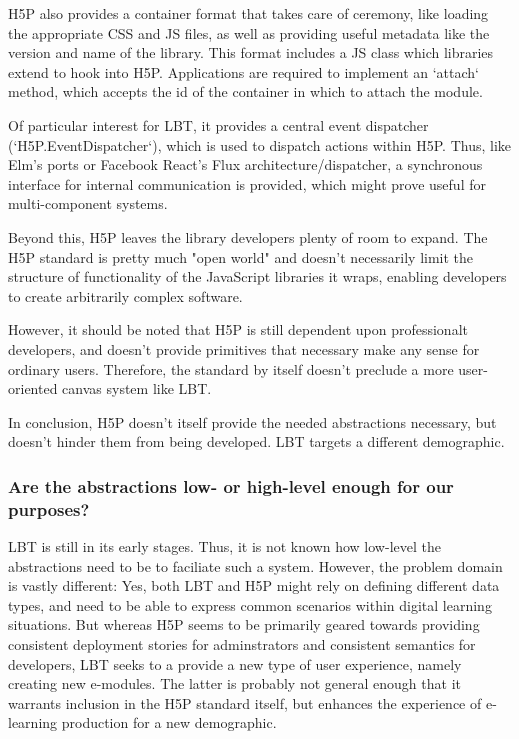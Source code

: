H5P also provides a container format that takes care of ceremony, like loading
the appropriate CSS and JS files, as well as providing useful metadata like the
version and name of the library. This format includes a JS class which libraries
extend to hook into H5P. Applications are required to implement an `attach`
method, which accepts the id of the container in which to attach the module.

Of particular interest for LBT, it provides a central event dispatcher
(`H5P.EventDispatcher`)\cite{h5pdispatch}, which is used to dispatch actions
within H5P. Thus, like Elm's ports or Facebook React's Flux
architecture/dispatcher, a synchronous interface for internal communication is
provided, which might prove useful for multi-component systems.

Beyond this, H5P leaves the library developers plenty of room to expand. The H5P
standard is pretty much "open world" and doesn't necessarily limit the structure
of functionality of the JavaScript libraries it wraps, enabling developers to
create arbitrarily complex software.

However, it should be noted that H5P is still dependent upon professionalt
developers, and doesn't provide primitives that necessary make any sense for
ordinary users. Therefore, the standard by itself doesn't preclude a more
user-oriented canvas system like LBT.

In conclusion, H5P doesn't itself provide the needed abstractions necessary, but
doesn't hinder them from being developed. LBT targets a different demographic.

\subsubsection{Are the abstractions low- or high-level enough for our purposes?}

LBT is still in its early stages. Thus, it is not known how low-level the
abstractions need to be to faciliate such a system. However, the problem domain
is vastly different: Yes, both LBT and H5P might rely on defining different data
types, and need to be able to express common scenarios within digital learning
situations. But whereas H5P seems to be primarily geared towards providing
consistent deployment stories for adminstrators and consistent semantics for
developers, LBT seeks to a provide a new type of user experience, namely
creating new e-modules. The latter is probably not general enough that it
warrants inclusion in the H5P standard itself, but enhances the experience of
e-learning production for a new demographic. 

